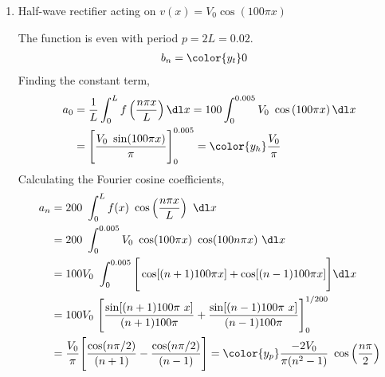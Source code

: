 \begin{enumerate}
    \item Half-wave rectifier acting on $ v(x) = V_0\cos(100 \pi x) $
          \begin{figure}[H]
              \centering
          \end{figure}
          The function is even with period $ p = 2L = 0.02 $.
          \begin{align}
              b_n & = \color{y_t} 0
          \end{align}
          Finding the constant term,
          \begin{align}
              a_0 & = \frac{1}{L} \int_{0}^{L} f\left( \frac{n\pi x}{L} \right) \dl x
              = 100 \int_{0}^{0.005} V_0\ \cos\left( 100\pi x \right) \dl x           \\
                  & = \Bigg[ \frac{V_0\ \sin(100\pi x)}{\pi} \Bigg]_{0}^{0.005}
              = \color{y_h} \frac{V_0}{\pi}
          \end{align}
          Calculating the Fourier cosine coefficients,
          \begin{align}
              a_n & = 200\ \int_{0}^{L} f(x)\ \cos\left( \frac{n\pi x}{L} \right)
              \ \dl x                                                             \\
                  & = 200\ \int_{0}^{0.005} V_0\ \cos(100\pi x)\ \cos(100n\pi x)
              \ \dl x                                                             \\
                  & = 100V_0\ \int_{0}^{0.005} \Bigg[ \cos[(n+1)100\pi x]
              + \cos[(n-1)100\pi x] \Bigg] \dl x                                  \\
                  & = 100V_0\ \Bigg[ \frac{\sin[(n+1)100\pi\ x]}{(n+1)100\pi}
              + \frac{\sin[(n-1)100\pi\ x]}{(n-1)100\pi}  \Bigg]_{0}^{1/200}      \\
                  & = \frac{V_0}{\pi} \Bigg[ \frac{\cos(n\pi/2)}{(n+1)}
                  - \frac{\cos(n\pi/2)}{(n-1)} \Bigg]
              = \color{y_p} \frac{-2V_0}{\pi (n^2 - 1)}\ \cos\left(
              \frac{n\pi}{2} \right)
          \end{align}


\end{enumerate}
